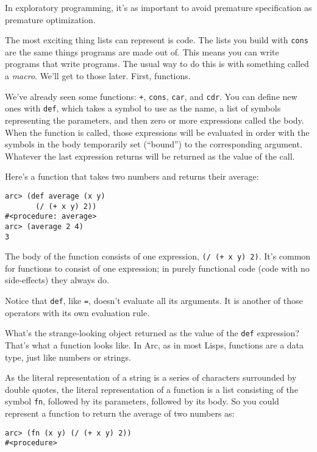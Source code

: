 \documentclass[a4paper,12pt]{book}
\begin{document}
In exploratory programming, it's as important to avoid premature
specification as premature optimization.

The most exciting thing lists can represent is code.  The lists you
build with \verb|cons| are the same things programs are made out of.  This
means you can write programs that write programs.  The usual way
to do this is with something called a {\em{}macro}.  We'll get to those
later.  First, functions.

We've already seen some functions: {\tt+}, \verb|cons|, \verb|car|, and \verb|cdr|.  You can
define new ones with \verb|def|, which takes a symbol to use as the name,
a list of symbols representing the parameters, and then zero or
more expressions called the body.  When the function is called,
those expressions will be evaluated in order with the symbols in
the body temporarily set (``bound'') to the corresponding argument.
Whatever the last expression returns will be returned as the value
of the call.

Here's a function that takes two numbers and returns their average:

\begin{verbatim}
arc> (def average (x y) 
       (/ (+ x y) 2))
#<procedure: average>
arc> (average 2 4)
3
\end{verbatim}

The body of the function consists of one expression, \verb|(/ (+ x y) 2)|.
It's common for functions to consist of one expression; in purely
functional code (code with no side-effects) they always do.

Notice that \verb|def|, like {\tt=}, doesn't evaluate all its arguments.  It
is another of those operators with its own evaluation rule.

What's the strange-looking object returned as the value of the \verb|def|
expression?  That's what a function looks like.  In {\sc{}Arc}, as in most
{\sc{}Lisp}s, functions are a data type, just like numbers or strings.

As the literal representation of a string is a series of characters
surrounded by double quotes, the literal representation of a function
is a list consisting of the symbol {\tt{}fn}, followed by its parameters,
followed by its body.  So you could represent a function to return
the average of two numbers as:

\begin{verbatim}
arc> (fn (x y) (/ (+ x y) 2))
#<procedure>
\end{verbatim}
\end{document}
